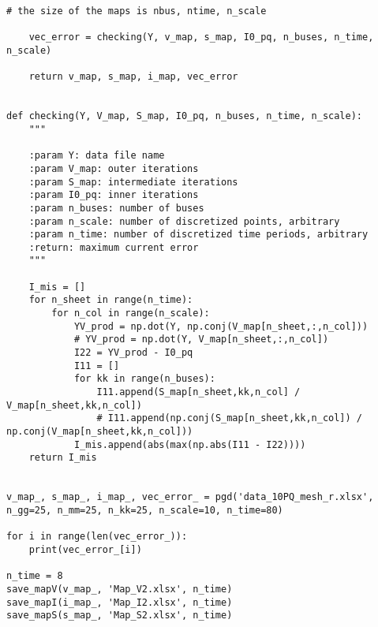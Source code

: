 \begin{lstlisting}[caption={Proper Generalized Decomposition code in Python}]
    # the size of the maps is nbus, ntime, n_scale

    vec_error = checking(Y, v_map, s_map, I0_pq, n_buses, n_time, n_scale)

    return v_map, s_map, i_map, vec_error


def checking(Y, V_map, S_map, I0_pq, n_buses, n_time, n_scale):
    """

    :param Y: data file name
    :param V_map: outer iterations
    :param S_map: intermediate iterations
    :param I0_pq: inner iterations
    :param n_buses: number of buses
    :param n_scale: number of discretized points, arbitrary
    :param n_time: number of discretized time periods, arbitrary
    :return: maximum current error
    """

    I_mis = []
    for n_sheet in range(n_time):
        for n_col in range(n_scale):
            YV_prod = np.dot(Y, np.conj(V_map[n_sheet,:,n_col]))
            # YV_prod = np.dot(Y, V_map[n_sheet,:,n_col])
            I22 = YV_prod - I0_pq
            I11 = []
            for kk in range(n_buses):
                I11.append(S_map[n_sheet,kk,n_col] / V_map[n_sheet,kk,n_col])
                # I11.append(np.conj(S_map[n_sheet,kk,n_col]) / np.conj(V_map[n_sheet,kk,n_col]))
            I_mis.append(abs(max(np.abs(I11 - I22))))
    return I_mis


v_map_, s_map_, i_map_, vec_error_ = pgd('data_10PQ_mesh_r.xlsx', n_gg=25, n_mm=25, n_kk=25, n_scale=10, n_time=80)

for i in range(len(vec_error_)):
    print(vec_error_[i])

n_time = 8
save_mapV(v_map_, 'Map_V2.xlsx', n_time)
save_mapI(i_map_, 'Map_I2.xlsx', n_time)
save_mapS(s_map_, 'Map_S2.xlsx', n_time)


\end{lstlisting}
